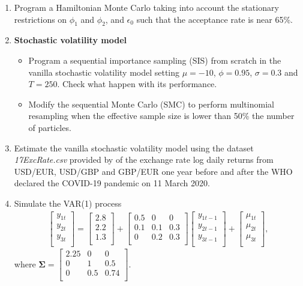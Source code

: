 \begin{enumerate}
	\item Program a Hamiltonian Monte Carlo taking into account the stationary restrictions on $\phi_1$ and $\phi_2$, and $\epsilon_0$ such that the acceptance rate is near 65\%. 
	
	\item \textbf{Stochastic volatility model}
	\begin{itemize}
		\item Program a sequential importance sampling (SIS) from scratch in the vanilla stochastic volatility model setting $\mu=-10$, $\phi = 0.95$, $\sigma=0.3$ and $T=250$. Check what happen with its performance.
		\item Modify the sequential Monte Carlo (SMC) to perform multinomial resampling when the effective sample size is lower than 50\% the number of particles.  
	\end{itemize}

	\item Estimate the vanilla stochastic volatility model using the dataset \textit{17ExcRate.csv} provided by \cite{ramirez2024testing} of the exchange rate log daily returns from USD/EUR, USD/GBP and GBP/EUR one year before and after the WHO declared the COVID-19 pandemic on 11 March 2020.
	
	\item Simulate the VAR(1) process
	\begin{align*}
		\begin{bmatrix}
			y_{1t}\\
			y_{2t}\\
			y_{3t}\\
		\end{bmatrix} = \begin{bmatrix}
			2.8\\
			2.2\\
			1.3\\
		\end{bmatrix} + \begin{bmatrix}
			0.5 & 0 & 0\\
			0.1 & 0.1 & 0.3\\
			0 & 0.2 & 0.3\\
		\end{bmatrix} \begin{bmatrix}
			y_{1t-1}\\
			y_{2t-1}\\
			y_{3t-1}\\
		\end{bmatrix} +\begin{bmatrix}
			\mu_{1t}\\
			\mu_{2t}\\
			\mu_{3t}\\
		\end{bmatrix},
	\end{align*}
	where $\bm{\Sigma}= \begin{bmatrix}
		2.25 & 0 & 0\\
		0 & 1 & 0.5\\
		0 & 0.5 & 0.74\\
	\end{bmatrix}$.


\end{enumerate}
